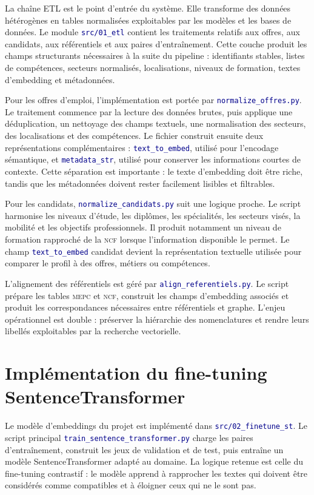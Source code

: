 \documentclass[12pt,twoside]{report}
\newcommand{\filevar}[1]{\texttt{\textcolor{darkblue}{#1}}}
\newcommand{\MEPC}{\textsc{mepc}}
\newcommand{\NCF}{\textsc{ncf}}
\begin{document}
La chaîne ETL est le point d'entrée du système. Elle transforme des données hétérogènes en tables normalisées exploitables par les modèles et les bases de données. Le module \filevar{src/01\_etl} contient les traitements relatifs aux offres, aux candidats, aux référentiels et aux paires d'entraînement. Cette couche produit les champs structurants nécessaires à la suite du pipeline : identifiants stables, listes de compétences, secteurs normalisés, localisations, niveaux de formation, textes d'embedding et métadonnées.

Pour les offres d'emploi, l'implémentation est portée par \filevar{normalize\_offres.py}. Le traitement commence par la lecture des données brutes, puis applique une déduplication, un nettoyage des champs textuels, une normalisation des secteurs, des localisations et des compétences. Le fichier construit ensuite deux représentations complémentaires : \filevar{text\_to\_embed}, utilisé pour l'encodage sémantique, et \filevar{metadata\_str}, utilisé pour conserver les informations courtes de contexte. Cette séparation est importante : le texte d'embedding doit être riche, tandis que les métadonnées doivent rester facilement lisibles et filtrables.

Pour les candidats, \filevar{normalize\_candidats.py} suit une logique proche. Le script harmonise les niveaux d'étude, les diplômes, les spécialités, les secteurs visés, la mobilité et les objectifs professionnels. Il produit notamment un niveau de formation rapproché de la \NCF{} lorsque l'information disponible le permet. Le champ \filevar{text\_to\_embed} candidat devient la représentation textuelle utilisée pour comparer le profil à des offres, métiers ou compétences.

L'alignement des référentiels est géré par \filevar{align\_referentiels.py}. Le script prépare les tables \MEPC{} et \NCF{}, construit les champs d'embedding associés et produit les correspondances nécessaires entre référentiels et graphe. L'enjeu opérationnel est double : préserver la hiérarchie des nomenclatures et rendre leurs libellés exploitables par la recherche vectorielle.

\section{Implémentation du fine-tuning SentenceTransformer}

Le modèle d'embeddings du projet est implémenté dans \filevar{src/02\_finetune\_st}. Le script principal \filevar{train\_sentence\_transformer.py} charge les paires d'entraînement, construit les jeux de validation et de test, puis entraîne un modèle SentenceTransformer adapté au domaine. La logique retenue est celle du fine-tuning contrastif : le modèle apprend à rapprocher les textes qui doivent être considérés comme compatibles et à éloigner ceux qui ne le sont pas.
\end{document}
